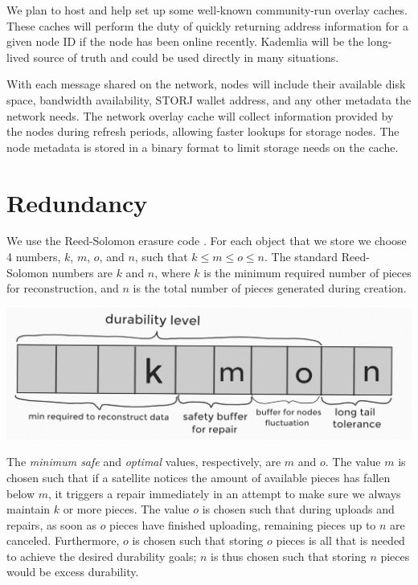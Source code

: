 \documentclass[11pt,fleqn,openany]{book}
\begin{document}
We plan to host and help set up some well-known community-run overlay caches.
These caches will perform the duty of quickly returning address information
for a given node ID if the node has been online recently. Kademlia will be the
long-lived source of truth and could be used directly in many situations.

With each message shared on the network, nodes will include their available
disk space, bandwidth availability, STORJ wallet address, and any other
metadata the network needs.
The network overlay cache will collect information provided by the nodes
during refresh periods, allowing faster lookups for storage nodes.
The node metadata is stored in a binary format to limit storage
needs on the cache.

\section{Redundancy}

We use the Reed-Solomon erasure code \cite{rs}. For each object that we store
we choose 4 numbers, $k$, $m$, $o$, and $n$, such that $k\le m\le o\le n$.
The standard Reed-Solomon numbers are $k$ and $n$, where $k$ is the minimum
required number of pieces for reconstruction, and $n$ is the total number of
pieces generated during creation.

\begin{center}
\includegraphics[width=\textwidth]{diagram-drafts/redundancy_kmon.png}
\end{center}

The {\em minimum safe} and {\em optimal} values, respectively, are $m$ and $o$. The
value $m$ is chosen such that if a satellite notices the amount of available pieces
has fallen below $m$, it triggers a repair
immediately in an attempt to make sure we always maintain
$k$ or more pieces. The value $o$ is chosen such that during uploads and repairs,
as soon as $o$ pieces have finished uploading, remaining pieces up to $n$ are
canceled.
Furthermore, $o$ is chosen such that storing $o$ pieces is all that is
needed to achieve the desired durability goals; $n$ is thus chosen such that
storing $n$ pieces would be excess durability.
\end{document}
